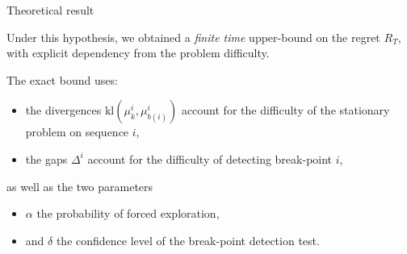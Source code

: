 \documentclass[11pt,french,ignorenonframetext,]{beamer}
\begin{document}
\begin{frame}{Theoretical result}

  Under this hypothesis, we obtained a \emph{finite time}
  upper-bound on the regret $R_T$,
  with explicit dependency from the problem difficulty.

  The exact bound uses:
  \begin{itemize}
    \item
    the divergences $\mathrm{kl}(\mu_{k}^{i},\mu_{b(i)}^{i})$
    account for the difficulty of the stationary problem on sequence $i$,
    \item
    the gaps $\Delta^{i}$
    account for the difficulty of detecting break-point $i$,
  \end{itemize}
  as well as the two parameters
  \begin{itemize}
    \item
    $\alpha$ the probability of forced exploration,
    \item
    and $\delta$ the confidence level of the break-point detection test.
  \end{itemize}

\end{frame}
\end{document}
